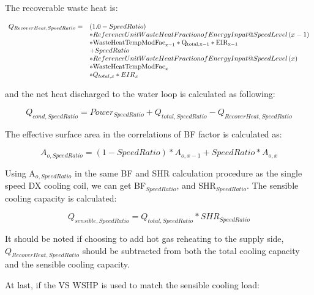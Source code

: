 The recoverable waste heat is:

\begin{equation}
  \begin{array}{rl}
    Q_{RecoverHeat,SpeedRatio} =& \left( {1.0 - SpeedRatio} \right) \\
                               &* ReferenceUnitWasteHeatFractionofEnergyInput@SpeedLevel\left( {x - 1} \right) \\
                               &* \rm{WasteHeatTempModFac}_{x - 1} * {Q_{total,x - 1}} * EIR_{x - 1} \\
                               &+ SpeedRatio \\
                               &* ReferenceUnitWasteHeatFractionofEnergyInput@SpeedLevel\left( x \right) \\
                               &* \rm{WasteHeatTempModFac}_x \\
                               &* Q_{total,x} * EIR_x
  \end{array}
\end{equation}

and the net heat discharged to the water loop is calculated as following:

\begin{equation}
{Q_{cond,SpeedRatio}} = Powe{r_{SpeedRatio}} + {Q_{total,SpeedRatio}} - {Q_{RecoverHeat,SpeedRatio}}
\end{equation}

The effective surface area in the correlations of BF factor is calculated as:

\begin{equation}
{A_{o,SpeedRatio}} = \left( {1 - SpeedRatio} \right)*{A_{o,x - 1}} + SpeedRatio*{A_{o,x}}
\end{equation}

Using A\(_{o,SpeedRatio}\) in the same BF and SHR calculation procedure as the single speed DX cooling coil, we can get BF\(_{SpeedRatio}\), and SHR\(_{SpeedRatio}\).  The sensible cooling capacity is calculated:

\begin{equation}
{Q_{sensible,SpeedRatio}} = {Q_{total,SpeedRatio}}*SH{R_{SpeedRatio}}
\end{equation}

It should be noted if choosing to add hot gas reheating to the supply side, \({Q_{RecoverHeat,SpeedRatio}}\) should be subtracted from both the total cooling capacity and the sensible cooling capacity.

At last, if the VS WSHP is used to match the sensible cooling load:

